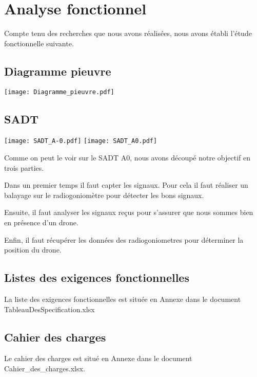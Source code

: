 \chapter{Analyse fonctionnel}

Compte tenu des recherches que nous avons réalisées, nous avons établi l'étude fonctionnelle suivante.

\section{Diagramme pieuvre}

\hspace{-2cm}
\texttt{[image: Diagramme\_pieuvre.pdf]}



\section{SADT}

\texttt{[image: SADT\_A-0.pdf]}
\texttt{[image: SADT\_A0.pdf]}

\parindent=15pt

Comme on peut le voir sur le SADT A0, nous avons découpé notre objectif en trois parties.

Dans un premier temps il faut capter les signaux. Pour cela il faut réaliser un balayage sur le radiogoniomètre pour détecter les bons signaux.

Ensuite, il faut analyser les signaux reçus pour s'assurer que nous sommes bien en présence d'un drone.

Enfin, il faut récupérer les données des radiogoniometres pour déterminer la position du drone.


\section{Listes des exigences fonctionnelles}

La liste des exigences fonctionnelles est située en Annexe dans le document TableauDesSpecification.xlsx

\section{Cahier des charges}

Le cahier des charges est situé en Annexe dans le document Cahier\_des\_charges.xlsx.




